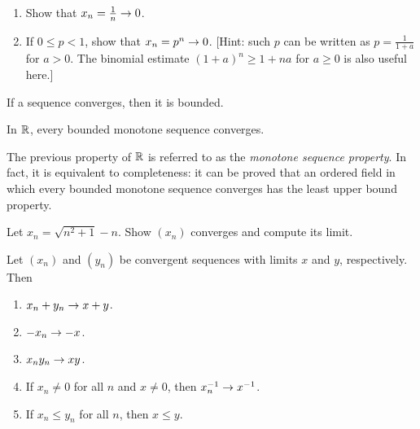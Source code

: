 \documentclass{book}
\begin{document}
\begin{ex}
\mbox{}
\begin{enumerate}
\item Show that $x_n = \frac 1 n \rightarrow 0$. 
\item If $0 \leq p < 1$, show that $x_n = p^n \rightarrow 0$. [Hint: such $p$ can be written as $p = \frac 1{1 + a}$ for $a > 0$. The binomial estimate $(1 + a)^n \geq 1 + na$ for $a \geq 0$ is also useful here.]
\end{enumerate}
\label{Ex:seqs}
\end{ex}

\begin{prop}
If a sequence converges, then it is bounded.
\label{P:cnvgt_seq_bdd}
\end{prop}


\begin{thm}
In $\mathbb{R}$, every bounded monotone sequence converges.
\label{T:MSP}
\end{thm}

\begin{rmk}
The previous property of $\mathbb{R}$ is referred to as the {\em monotone sequence
property}. In fact, it is equivalent to completeness: it can be proved that an
ordered field in which every bounded monotone sequence converges has the least upper bound property.
\end{rmk}

\begin{prob}
Let $x_n = \sqrt{n^2 + 1} - n$. Show $(x_n)$ converges and compute its limit.
\label{Pr:limit_renormalized}
\end{prob}


\begin{thm}
Let $(x_n)$ and $(y_n)$ be convergent sequences with limits $x$ and $y$, respectively. Then
\begin{enumerate}
\item $x_n + y_n \rightarrow x+y$.
\item $-x_n \rightarrow -x$. 
\item $x_ny_n \rightarrow xy$.
\item If $x_n \neq 0$ for all $n$ and $x \neq 0$, then $x_n^{-1} \rightarrow x^{-1}$.
\item If $x_n \leq y_n$ for all $n$, then $x \leq y$. 
\label{I:limit_thms_ineq}
\end{enumerate}
\label{T:limit_thms_seqs}
\end{thm}
\end{document}
